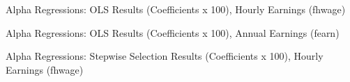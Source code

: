\documentclass[12pt]{article}
\begin{document}
\begin{onehalfspace}
\begin{table}[H]
    \centering
    \caption{Alpha Regressions: OLS Results (Coefficients x 100), Hourly Earnings (fhwage)}
    \label{tab:alpha_regressions}
    \resizebox{\textwidth}{!}{%
        
    }
\end{table}

\begin{table}[H]
    \centering
    \caption{Alpha Regressions: OLS Results (Coefficients x 100), Annual Earnings (fearn)}
    \label{tab:alpha_fearn_regressions}
    \resizebox{\textwidth}{!}{%
        
    }
\end{table}















\begin{table}[H]
    \centering
    \caption{Alpha Regressions: Stepwise Selection Results (Coefficients x 100), Hourly Earnings (fhwage)}
    \label{tab:alpha_stepwise}
    \resizebox{\textwidth}{!}{%
        
    }
\end{table}


\end{onehalfspace}
\end{document}

